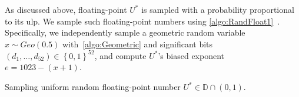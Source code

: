As discussed above, floating-point $U^{*}$ is sampled with a probability proportional to its ulp. We sample such floating-point numbers using \autoref{algo:RandFloat1}~\cite{walker1974fast,mironov2012significance}. Specifically, we independently sample a geometric random variable $x \sim Geo\left(0.5\right) $ with~\autoref{algo:Geometric} and significant bits $\left(d_{1},\ldots ,d_{52}\right)\in\left\{0,1\right\}^{52} $, and compute $U^{*}$'s biased exponent $e=1023-\left(x+1\right) $.

\begin{algorithm}[tbh!]
    \centering
    \caption{Sampling uniform random floating-point number $U^{*}\in\mathbb{D} \cap \left(0,1\right) $.}
    \label{algo:RandFloat1}
\end{algorithm}
\FloatBarrier

